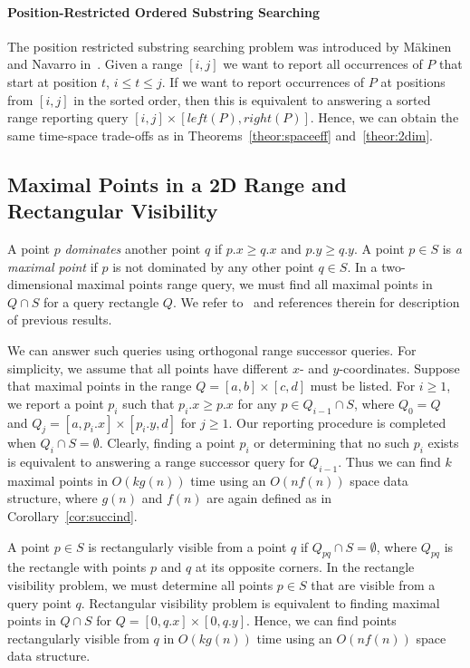 \documentclass[11pt]{article}
\def\id#1{\ensuremath{\mathit{#1}}}
\let\idit=\id
\newcommand{\lleft}{\idit{left}}
\newcommand{\rright}{\idit{right}}
\begin{document}
\paragraph{Position-Restricted Ordered Substring Searching}
The position restricted substring searching problem was introduced by  M{\"a}kinen and Navarro in~\cite{MakinN07}. Given a range $[i,j]$ 
we want to report all occurrences of $P$ that start at 
position $t$, $i\le t\le j$. 
If we want to report occurrences of $P$ at positions from 
$[i,j]$ in the sorted order, then this is equivalent to 
answering a sorted range reporting query $[i,j]\times [\lleft(P),\rright(P)]$. Hence, we can obtain the same 
time-space trade-offs as in Theorems~\ref{theor:spaceeff} and~\ref{theor:2dim}.


\subsection{Maximal  Points in a 2D Range and Rectangular Visibility}

A point $p$ \emph{dominates} another point $q$ if $p.x\ge q.x$ 
and $p.y\ge q.y$. A point $p\in S$ is \emph{a maximal point} 
if $p$ is not dominated by any other point $q\in S$. 
In a two-dimensional maximal points range  query, we must find  
all maximal points in  $Q\cap S$ for a query rectangle $Q$.
We refer to~\cite{BT11} and references therein for description of 
previous results.

We can answer such  queries using orthogonal range successor queries. 
For simplicity, we assume that all points have different $x$- and $y$-coordinates.
Suppose that maximal points in the range 
$Q=[a,b]\times [c,d]$ must be listed. For $i\ge 1$, we report a point  
$p_i$ such that $p_i.x\ge p.x$ for any $p\in Q_{i-1}\cap S$, where 
$Q_0=Q$ and $Q_j=[a,p_{i}.x]\times [p_i.y,d]$ for $j\ge 1$.
 Our reporting procedure is completed when $Q_i\cap S=\emptyset$.
Clearly, finding a point $p_i$ or determining that no such $p_i$ 
exists is equivalent to answering a range successor query for 
$Q_{i-1}$. Thus we can find $k$ maximal points in 
$O(kg(n))$ time using an $O(nf(n))$ space data structure, 
where $g(n)$ and $f(n)$ are again defined as in Corollary~\ref{cor:succind}.

A point $p\in S$ is rectangularly visible from a point $q$ 
if $Q_{pq}\cap S=\emptyset$, where $Q_{pq}$ is the rectangle 
with points $p$ and $q$ at its opposite corners. 
In the rectangle visibility problem, we must determine all 
points $p\in S$ that are visible from a query point $q$.  
Rectangular visibility problem is equivalent to 
finding maximal points in $Q\cap S$ for $Q=[0,q.x]\times [0,q.y]$.
Hence, we can find points rectangularly visible from 
$q$ in $O(kg(n))$ time using an $O(nf(n))$ space data structure. 



\end{document}
